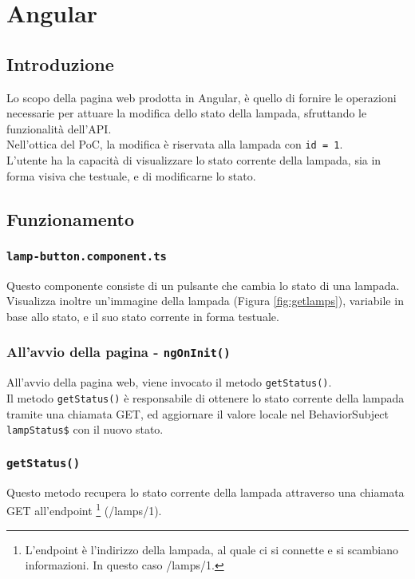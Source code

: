 \chapter{Angular}\label{angular}

\section{Introduzione}

Lo scopo della pagina web prodotta in Angular, è quello di fornire le operazioni necessarie per attuare la modifica dello stato della lampada, sfruttando le funzionalità dell'API. \\
Nell'ottica del PoC, la modifica è riservata alla lampada con \texttt{id = 1}. \\
L'utente ha la capacità di visualizzare lo stato corrente della lampada, sia in forma visiva che testuale, e di modificarne lo stato. 

\section{Funzionamento}

\subsection{\texttt{lamp-button.component.ts}}
Questo componente consiste di un pulsante che cambia lo stato di una lampada. Visualizza inoltre un'immagine della lampada (Figura \ref{fig:getlamps}), variabile in base allo stato, e il suo stato corrente in forma testuale.

\subsection{All'avvio della pagina - \texttt{ngOnInit()}}
All'avvio della pagina web, viene invocato il metodo \texttt{getStatus()}.\\
Il metodo \texttt{getStatus()} è responsabile di ottenere lo stato corrente della lampada tramite una chiamata GET, ed aggiornare il valore locale nel BehaviorSubject \texttt{lampStatus\$} con il nuovo stato.

\subsection{\texttt{getStatus()}}
Questo metodo recupera lo stato corrente della lampada attraverso una chiamata GET all'endpoint \footnote{L'endpoint è l'indirizzo della lampada, al quale ci si connette e si scambiano informazioni. In questo caso /lamps/1.} (/lamps/1). \\

